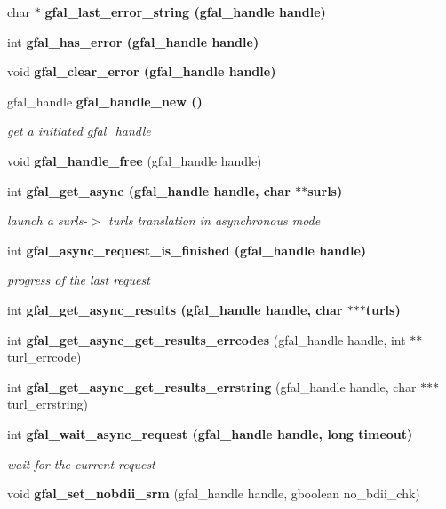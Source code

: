\begin{CompactItemize}
\item 
char $\ast$ \bf{gfal\_\-last\_\-error\_\-string} (gfal\_\-handle handle)
\item 
int \bf{gfal\_\-has\_\-error} (gfal\_\-handle handle)
\item 
void \bf{gfal\_\-clear\_\-error} (gfal\_\-handle handle)
\item 
gfal\_\-handle \bf{gfal\_\-handle\_\-new} ()
\begin{CompactList}\small\item\em get a initiated gfal\_\-handle \item\end{CompactList}\item 
void \textbf{gfal\_\-handle\_\-free} (gfal\_\-handle handle)\label{gfal__common__interface_8h_0071cb3665f7dca9648fa46bebeca524}

\item 
int \bf{gfal\_\-get\_\-async} (gfal\_\-handle handle, char $\ast$$\ast$surls)
\begin{CompactList}\small\item\em launch a surls-$>$ turls translation in asynchronous mode \item\end{CompactList}\item 
int \bf{gfal\_\-async\_\-request\_\-is\_\-finished} (gfal\_\-handle handle)
\begin{CompactList}\small\item\em progress of the last request \item\end{CompactList}\item 
int \bf{gfal\_\-get\_\-async\_\-results} (gfal\_\-handle handle, char $\ast$$\ast$$\ast$turls)
\item 
int \textbf{gfal\_\-get\_\-async\_\-get\_\-results\_\-errcodes} (gfal\_\-handle handle, int $\ast$$\ast$turl\_\-errcode)\label{gfal__common__interface_8h_a3161f12f9d5c8151f44df4f132602cb}

\item 
int \textbf{gfal\_\-get\_\-async\_\-get\_\-results\_\-errstring} (gfal\_\-handle handle, char $\ast$$\ast$$\ast$turl\_\-errstring)\label{gfal__common__interface_8h_ecd7d68b18088ff620d21dbef85862ae}

\item 
int \bf{gfal\_\-wait\_\-async\_\-request} (gfal\_\-handle handle, long timeout)
\begin{CompactList}\small\item\em wait for the current request \item\end{CompactList}\item 
void \textbf{gfal\_\-set\_\-nobdii\_\-srm} (gfal\_\-handle handle, gboolean no\_\-bdii\_\-chk)\label{gfal__common__interface_8h_5e3afd0690b23dedf14d6fa7898f28a9}

\end{CompactItemize}


